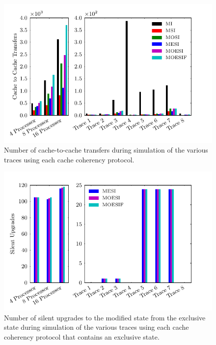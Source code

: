 \documentclass{article}
\newcommand\figsize{.9\linewidth}
\begin{document}
  \begin{figure}[htbp]
    \label{fig:transfers}
    \centering
    \begin{minipage}[t]{\figsize}
      \centering
      \includegraphics[width=\linewidth]{../runs/plots/transfers}
      \caption{Number of cache-to-cache transfers during simulation of
        the various traces using each cache coherency protocol.}
    \end{minipage}
  \end{figure}

  \begin{figure}[htbp]
    \label{fig:upgrades}
    \centering
    \begin{minipage}[t]{\figsize}
      \centering
      \includegraphics[width=\linewidth]{../runs/plots/upgrades}
      \caption{Number of silent upgrades to the modified state from
        the exclusive state during simulation of the various traces
        using each cache coherency protocol that contains an exclusive
        state.}
    \end{minipage}
  \end{figure}
\end{document}
